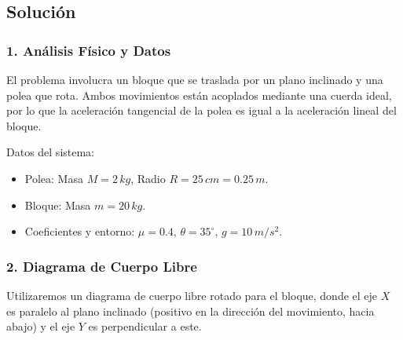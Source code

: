 \documentclass[12pt, a4paper]{article}
\begin{document}
\begin{center}
\end{center}

\subsection*{Solución}

\subsubsection*{1. Análisis Físico y Datos}
El problema involucra un bloque que se traslada por un plano inclinado y una polea que rota. Ambos movimientos están acoplados mediante una cuerda ideal, por lo que la aceleración tangencial de la polea es igual a la aceleración lineal del bloque.

Datos del sistema:
\begin{itemize}
    \item Polea: Masa $M = 2 \, \si{kg}$, Radio $R = 25 \, \si{cm} = 0.25 \, \si{m}$.
    \item Bloque: Masa $m = 20 \, \si{kg}$.
    \item Coeficientes y entorno: $\mu = 0.4$, $\theta = 35^\circ$, $g = 10 \, \si{m/s^2}$.
\end{itemize}

\subsubsection*{2. Diagrama de Cuerpo Libre}
Utilizaremos un diagrama de cuerpo libre rotado para el bloque, donde el eje $X$ es paralelo al plano inclinado (positivo en la dirección del movimiento, hacia abajo) y el eje $Y$ es perpendicular a este.
\end{document}
